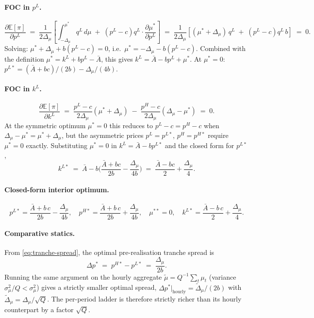 \documentclass[11pt]{article}
\begin{document}
\paragraph{FOC in $p^L$.}
\[
\frac{\partial \mathbb{E}[\pi]}{\partial p^L} \;=\; \frac{1}{2\Delta_\mu}\!\left[\int_{-\Delta_\mu}^{\mu^*}\!q^L \, d\mu \;+\; (p^L - c) q^L \cdot \frac{\partial \mu^*}{\partial p^L}\right] \;=\; \frac{1}{2\Delta_\mu}\!\left[(\mu^* + \Delta_\mu)\, q^L \;+\; (p^L - c) q^L\, b\right] \;=\; 0.
\]
Solving: $\mu^* + \Delta_\mu + b(p^L - c) = 0$, i.e.\ $\mu^* = -\Delta_\mu - b(p^L - c)$. Combined with the definition $\mu^* = k^L + b p^L - \bar A$, this gives $k^L = \bar A - b p^L + \mu^*$. At $\mu^* = 0$: $p^{L*} = (\bar A + b c)/(2 b) - \Delta_\mu/(4 b)$.

\paragraph{FOC in $k^L$.}
\[
\frac{\partial \mathbb{E}[\pi]}{\partial k^L} \;=\; \frac{p^L - c}{2 \Delta_\mu}(\mu^* + \Delta_\mu) \;-\; \frac{p^H - c}{2\Delta_\mu}(\Delta_\mu - \mu^*) \;=\; 0.
\]
At the symmetric optimum $\mu^* = 0$ this reduces to $p^L - c = p^H - c$ when $\Delta_\mu - \mu^* = \mu^* + \Delta_\mu$, but the asymmetric prices $p^L = p^{L*}$, $p^H = p^{H*}$ require $\mu^* = 0$ exactly. Substituting $\mu^* = 0$ in $k^L = \bar A - b p^{L*}$ and the closed form for $p^{L*}$,
\[
k^{L*} \;=\; \bar A - b\bigg(\frac{\bar A + bc}{2b} - \frac{\Delta_\mu}{4b}\bigg) \;=\; \frac{\bar A - b c}{2} + \frac{\Delta_\mu}{4}.
\]

\paragraph{Closed-form interior optimum.}
\begin{equation}
\boxed{\;p^{L*} = \frac{\bar A + b\, c}{2 b} - \frac{\Delta_\mu}{4 b},
\quad
p^{H*} = \frac{\bar A + b\, c}{2 b} + \frac{\Delta_\mu}{4 b},
\quad
\mu^{**} = 0,
\quad
k^{L*} = \frac{\bar A - b\, c}{2} + \frac{\Delta_\mu}{4}.\;}
\label{eq:tranche-spread}
\end{equation}

\paragraph{Comparative statics.} From \eqref{eq:tranche-spread}, the optimal pre-realisation tranche spread is
\begin{equation}
\Delta p^* \;=\; p^{H*} - p^{L*} \;=\; \frac{\Delta_\mu}{2 b}.
\label{eq:spread-cs}
\end{equation}
Running the same argument on the hourly aggregate $\tilde\mu = Q^{-1} \sum_t \mu_t$ (variance $\sigma_\mu^2/Q < \sigma_\mu^2$) gives a strictly smaller optimal spread, $\Delta p^*|_{\text{hourly}} = \tilde\Delta_\mu/(2 b)$ with $\tilde\Delta_\mu = \Delta_\mu/\sqrt{Q}$. The per-period ladder is therefore strictly richer than its hourly counterpart by a factor $\sqrt{Q}$.
\end{document}
